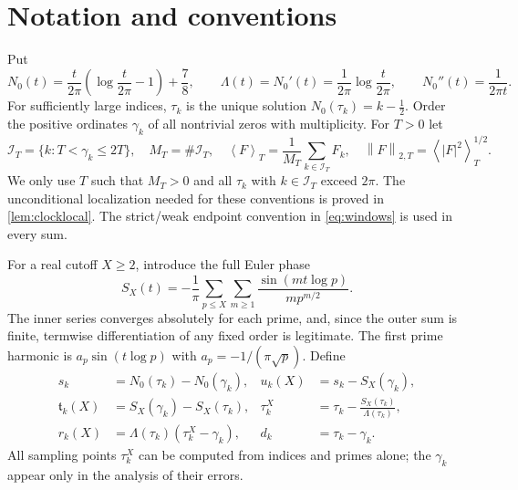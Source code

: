 \documentclass[11pt,reqno]{amsart}
\numberwithin{equation}{section}
\newcommand{\av}[1]{\left\langle #1\right\rangle_T}
\newcommand{\norm}[1]{\left\|#1\right\|_{2,T}}
\newcommand{\calI}{\mathcal I_T}
\newcommand{\lamb}{\Lambda}
\begin{document}
\section{Notation and conventions}\label{sec:notation}
Put
\begin{equation}\label{eq:N0}
N_0(t)=\frac{t}{2\pi}\left(\log\frac{t}{2\pi}-1\right)+\frac78,
\qquad \lamb(t)=N_0'(t)=\frac1{2\pi}\log\frac{t}{2\pi},\qquad
N_0''(t)=\frac1{2\pi t}.
\end{equation}
For sufficiently large indices, $\tau_k$ is the unique solution $N_0(\tau_k)=k-\tfrac12$. Order the positive ordinates $\gamma_k$ of all nontrivial zeros with multiplicity. For $T>0$ let
\begin{equation}\label{eq:windows}
\calI=\{k:T<\gamma_k\le 2T\},\quad M_T=\#\calI,
\quad\av{F}=\frac1{M_T}\sum_{k\in\calI}F_k,\quad \norm{F}=\av{|F|^2}^{1/2}.
\end{equation}
We only use $T$ such that $M_T>0$ and all $\tau_k$ with $k\in\calI$ exceed $2\pi$.  The unconditional localization needed for these conventions is proved in \cref{lem:clocklocal}. The strict/weak endpoint convention in \eqref{eq:windows} is used in every sum.

For a real cutoff $X\ge2$, introduce the full Euler phase
\begin{equation}\label{eq:Sx}
S_X(t)=-\frac1\pi\sum_{p\le X}\sum_{m\ge1}
\frac{\sin(mt\log p)}{m p^{m/2}}.
\end{equation}
The inner series converges absolutely for each prime, and, since the outer sum is finite, termwise differentiation of any fixed order is legitimate. The first prime harmonic is $a_p\sin(t\log p)$ with $a_p=-1/(\pi\sqrt p)$. Define
\begin{equation}\label{eq:defs}
\begin{aligned}
s_k&=N_0(\tau_k)-N_0(\gamma_k),
&u_k(X)&=s_k-S_X(\gamma_k),\\
\mathfrak t_k(X)&=S_X(\gamma_k)-S_X(\tau_k),
&\tau_k^X&=\tau_k-\frac{S_X(\tau_k)}{\lamb(\tau_k)},\\
r_k(X)&=\lamb(\tau_k)(\tau_k^X-\gamma_k),
&d_k&=\tau_k-\gamma_k.
\end{aligned}
\end{equation}
All sampling points $\tau_k^X$ can be computed from indices and primes alone; the $\gamma_k$ appear only in the analysis of their errors.
\end{document}
